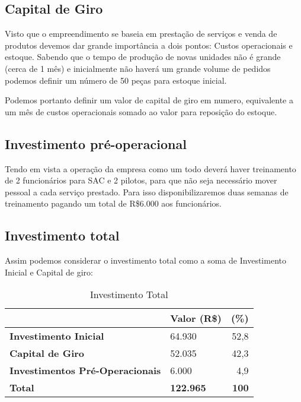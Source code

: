 \subsection{Capital de Giro}

Visto que o empreendimento se baseia em prestação de serviços e venda de produtos devemos dar grande importância a dois pontos: Custos operacionais e estoque. Sabendo que o tempo de produção de novas unidades não é grande (cerca de 1 mês) e inicialmente não haverá um grande volume de pedidos podemos definir um número de 50 peças para estoque inicial.

Podemos portanto definir um valor de capital de giro em {numero}, equivalente a um mês de custos operacionais somado ao valor para reposição do estoque.

\subsection{Investimento pré-operacional}

Tendo em vista a operação da empresa como um todo deverá haver treinamento de 2 funcionários para SAC e 2 pilotos, para que não seja necessário mover pessoal a cada serviço prestado. Para isso disponibilizaremos duas semanas de treinamento pagando um total de R\$6.000 aos funcionários.

\subsection{Investimento total}

Assim podemos considerar o investimento total como a soma de Investimento Inicial e Capital de giro:


\begin{table}[h]
	\centering
	\begin{tabular}{|l|l|r|}
		\hline
		\textbf{}                      			& \multicolumn{1}{c|}{\textbf{Valor (R\$)}} & \multicolumn{1}{c|}{\textbf{(\%)}} \\ \hline
		\textbf{Investimento Inicial}           & 64.930                                    & 52,8                               \\ \hline
		\textbf{Capital de Giro}                & 52.035                                    & 42,3                               \\ \hline
		\textbf{Investimentos Pré-Operacionais} & 6.000                                     & 4,9                                \\ \hline
		\textbf{Total}                          & \textbf{122.965}                          & \textbf{100}                       \\ \hline
	\end{tabular}
	\caption{Investimento Total}
	\label{investimentoTotal}
\end{table}

